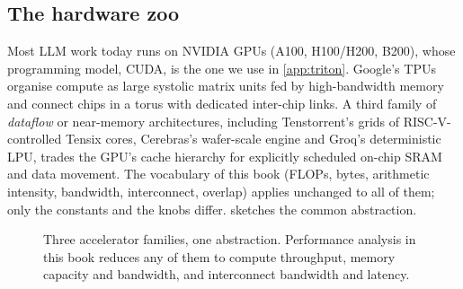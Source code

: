 \subsection{The hardware zoo}
Most LLM work today runs on NVIDIA GPUs (A100, H100/H200, B200), whose programming model, CUDA, is
the one we use in \cref{app:triton}. Google's TPUs organise compute as large systolic matrix units fed by
high-bandwidth memory and connect chips in a torus with dedicated inter-chip links. A third family of
\emph{dataflow} or near-memory architectures, including Tenstorrent's grids of RISC-V-controlled Tensix
cores, Cerebras's wafer-scale engine and Groq's deterministic LPU, trades the GPU's cache hierarchy for
explicitly scheduled on-chip SRAM and data movement. The vocabulary of this book (FLOPs, bytes, arithmetic
intensity, bandwidth, interconnect, overlap) applies unchanged to all of them; only the constants and
the knobs differ.  sketches the common abstraction.

\begin{figure}[t]
\centering
{}
\caption{Three accelerator families, one abstraction. Performance analysis in this book reduces any of
them to compute throughput, memory capacity and bandwidth, and interconnect bandwidth and latency.}
\label{fig:landscape:hwzoo}
\end{figure}


